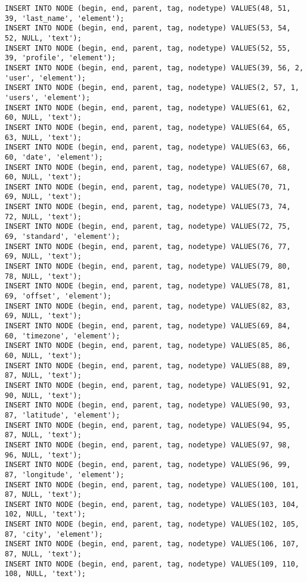 \begin{verbatim}
INSERT INTO NODE (begin, end, parent, tag, nodetype) VALUES(48, 51, 39, 'last_name', 'element');
INSERT INTO NODE (begin, end, parent, tag, nodetype) VALUES(53, 54, 52, NULL, 'text');
INSERT INTO NODE (begin, end, parent, tag, nodetype) VALUES(52, 55, 39, 'profile', 'element');
INSERT INTO NODE (begin, end, parent, tag, nodetype) VALUES(39, 56, 2, 'user', 'element');
INSERT INTO NODE (begin, end, parent, tag, nodetype) VALUES(2, 57, 1, 'users', 'element');
INSERT INTO NODE (begin, end, parent, tag, nodetype) VALUES(61, 62, 60, NULL, 'text');
INSERT INTO NODE (begin, end, parent, tag, nodetype) VALUES(64, 65, 63, NULL, 'text');
INSERT INTO NODE (begin, end, parent, tag, nodetype) VALUES(63, 66, 60, 'date', 'element');
INSERT INTO NODE (begin, end, parent, tag, nodetype) VALUES(67, 68, 60, NULL, 'text');
INSERT INTO NODE (begin, end, parent, tag, nodetype) VALUES(70, 71, 69, NULL, 'text');
INSERT INTO NODE (begin, end, parent, tag, nodetype) VALUES(73, 74, 72, NULL, 'text');
INSERT INTO NODE (begin, end, parent, tag, nodetype) VALUES(72, 75, 69, 'standard', 'element');
INSERT INTO NODE (begin, end, parent, tag, nodetype) VALUES(76, 77, 69, NULL, 'text');
INSERT INTO NODE (begin, end, parent, tag, nodetype) VALUES(79, 80, 78, NULL, 'text');
INSERT INTO NODE (begin, end, parent, tag, nodetype) VALUES(78, 81, 69, 'offset', 'element');
INSERT INTO NODE (begin, end, parent, tag, nodetype) VALUES(82, 83, 69, NULL, 'text');
INSERT INTO NODE (begin, end, parent, tag, nodetype) VALUES(69, 84, 60, 'timezone', 'element');
INSERT INTO NODE (begin, end, parent, tag, nodetype) VALUES(85, 86, 60, NULL, 'text');
INSERT INTO NODE (begin, end, parent, tag, nodetype) VALUES(88, 89, 87, NULL, 'text');
INSERT INTO NODE (begin, end, parent, tag, nodetype) VALUES(91, 92, 90, NULL, 'text');
INSERT INTO NODE (begin, end, parent, tag, nodetype) VALUES(90, 93, 87, 'latitude', 'element');
INSERT INTO NODE (begin, end, parent, tag, nodetype) VALUES(94, 95, 87, NULL, 'text');
INSERT INTO NODE (begin, end, parent, tag, nodetype) VALUES(97, 98, 96, NULL, 'text');
INSERT INTO NODE (begin, end, parent, tag, nodetype) VALUES(96, 99, 87, 'longitude', 'element');
INSERT INTO NODE (begin, end, parent, tag, nodetype) VALUES(100, 101, 87, NULL, 'text');
INSERT INTO NODE (begin, end, parent, tag, nodetype) VALUES(103, 104, 102, NULL, 'text');
INSERT INTO NODE (begin, end, parent, tag, nodetype) VALUES(102, 105, 87, 'city', 'element');
INSERT INTO NODE (begin, end, parent, tag, nodetype) VALUES(106, 107, 87, NULL, 'text');
INSERT INTO NODE (begin, end, parent, tag, nodetype) VALUES(109, 110, 108, NULL, 'text');

\end{verbatim}

